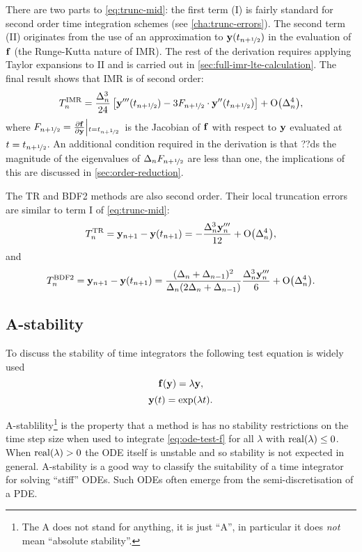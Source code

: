 There are two parts to \cref{eq:trunc-mid}: the first term (I) is fairly standard for second order time integration schemes (see \eg \cref{cha:trunc-errors}).
The second term (II) originates from the use of an approximation to $\mathbf{y}(t_{n+\nicefrac{1}{2}})$ in the evaluation of ${\mathbf{f}}$ (\ie the Runge-Kutta nature of IMR).
The rest of the derivation requires applying Taylor expansions to II and is carried out in \cref{sec:full-imr-lte-calculation}.
The final result shows that IMR is of second order:
\begin{equation}
  \lte^\imr = \frac{\dtn^3}{24} \left[\yvhf['''] - 3 \dfdyhf \cdot \yvhf[''] \right]
  + \order{\dtn^4},
  \label{eq:trunc-final}
\end{equation}
where $F_{n+\nicefrac{1}{2}} = \frac{\partial {\mathbf{f}}}{\partial \mathbf{y}}{\left|_{t=t_{n+\nicefrac{1}{2}}}\right.}$ is the Jacobian of ${\mathbf{f}}$ with respect to $\mathbf{y}$ evaluated at $t=t_{n+\nicefrac{1}{2}}$.
An additional condition required in the derivation is that ??ds the magnitude of the eigenvalues of $\Delta_{n}F_{n+\nicefrac{1}{2}}$ are less than one, the implications of this are discussed in \cref{sec:order-reduction}.

The TR \cite[261]{GreshoSani} and BDF2 \cite[715]{GreshoSani} methods are also second order.
Their local truncation errors are similar to term I of \cref{eq:trunc-mid}:
\begin{equation}
  \label{eq:tr-lte}
  \lte^\tr = \yv_{n+1} - \yv(t_{n+1}) = -\frac{\dtn^3 \yv_n'''}{12}
  + \order{\dtn^4},
\end{equation}
and
\begin{equation}
  \label{eq:bdf2-lte}
  \lte^\bdf = \yv_{n+1} - \yv(t_{n+1}) = \frac{(\dtn + \dtx{n-1})^2}{\dtn(2\dtn + \dtx{n-1})}
  \frac{\dtn^3 \yv_n'''}{6}
  + \order{\dtn^4}.
\end{equation}


\subsection{A-stability}
\label{sec:A-stability}

To discuss the stability of time integrators the following test equation is widely used
\begin{equation}
  \ffv{\yv} = \lambda \yv,
  \label{eq:ode-test-f}
\end{equation}
\ie
\begin{equation}
  \mathbf{y}(t) = \exp(\lambda t).
\end{equation}

A-stablility\footnote{The A does not stand for anything, it is just ``A''\cite[40]{HairerWanner}, in particular it does \emph{not} mean ``absolute stability''.} is the property that a method is has no stability restrictions on the time step size when used to integrate \cref{eq:ode-test-f} for all $\lambda$ with $\operatorname{real}(\lambda) \leq 0$.
When $\operatorname{real}(\lambda) > 0$ the ODE itself is unstable and so stability is not expected in general.
A-stability is a good way to classify the suitability of a time integrator for solving ``stiff'' ODEs.
Such ODEs often emerge from the semi-discretisation of a PDE.


